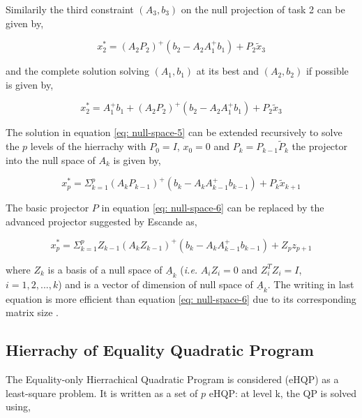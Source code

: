 Similarily the third constraint $(A_3, b_3)$ on the null projection of task 2 can be given by,

\begin{equation}
    \label{eq: null-space-4}
    x_2^* = (A_2P_2)^+(b_2 -  A_2A_1^+b_1) + P_2 \tilde{x}_3
\end{equation}

and the complete solution solving $(A_1, b_1)$ at its best and $(A_2, b_2)$ if possible is given by,

\begin{equation}
    \label{eq: null-space-5}
    x_2^* = A_1^+b_1 + (A_2P_2)^+(b_2 -  A_2A_1^+b_1) + P_2 \tilde{x}_3
\end{equation}

The solution in equation \ref{eq: null-space-5}  can be extended recursively to solve the $p$ levels of the hierrachy with $P_0 = I$, $x_0 = 0$ and $P_k = P_{k - 1}\tilde{P}_k$ the projector into the null space of $A_k$
is given by,

\begin{equation}
    \label{eq: null-space-6}
    x_p^* = \Sigma_{k=1}^p (A_kP_{k-1})^+(b_k -  A_kA_{k - 1}^+b_{k - 1}) + P_k \tilde{x}_{k+1}
\end{equation}

The basic projector $P$ in equation \ref{eq: null-space-6} can be replaced by the advanced projector suggested by Escande \cite{escande2010fast} as,

\begin{equation}
    \label{eq: null-space-7}
    x_p^* = \Sigma_{k=1}^p Z_{k - 1}(A_kZ_{k-1})^+(b_k -  A_kA_{k - 1}^+b_{k - 1}) + Z_pz_{p + 1}
\end{equation}

where $Z_k$ is a basis of a null space of $\underline{A}_k$ (\textit{i.e.} $A_iZ_i = 0$ and $Z_i^TZ_i = I$, $i = 1, 2, ..., k$) and is a vector of dimension of null space of $\underline{A}_k$.
The writing in last equation is more efficient than equation \ref{eq: null-space-6} due to its corresponding matrix size \cite{escande2014hierarchical}.

\subsection{Hierrachy of Equality Quadratic Program}

The Equality-only Hierrachical Quadratic Program is considered (eHQP) as a least-square problem. It is written
as a set of $p$ eHQP: at level k, the QP is  solved using,

